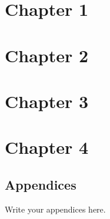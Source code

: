 \documentclass[12pt,a4paper,bold]{thesis}
\theoremstyle{thm}
\theoremstyle{definition}
\newcommand{\head}[1]{\newpage
\vspace{3em}
\begin{center}
\LARGE{\MakeUppercase{\textbf{#1}}}
\end{center}
\vspace{3em}
\addcontentsline{toc}{chapter}{#1}
}
\begin{document}


\tableofcontents


\chapter{Chapter 1} 
\label{ch:introduction}


\chapter{Chapter 2} \label{ch:ch2}

\newpage

\chapter{Chapter 3} \label{ch:ch3}

\newpage

\chapter{Chapter 4} \label{ch:ch4}


\begin{appendices}
\renewcommand{\thesection}{\Roman{section}}
\section{Appendices}
Write your appendices here.
\end{appendices}


\end{document}
